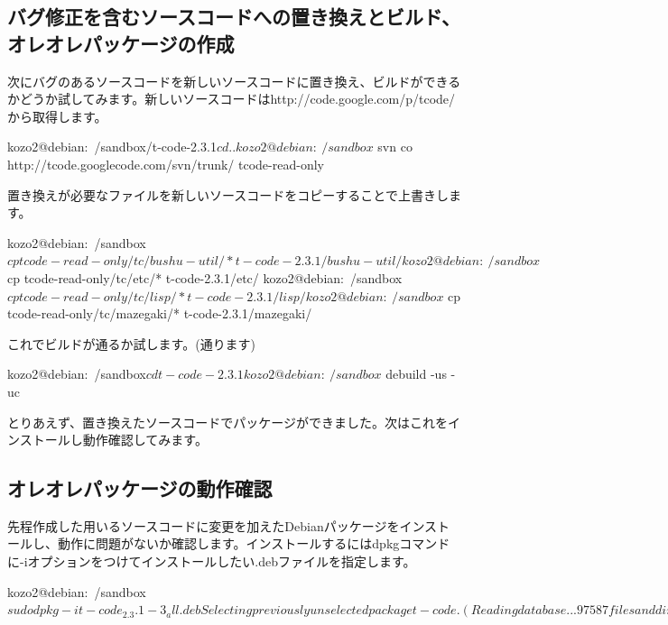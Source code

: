 \documentclass[mingoth,a4paper]{jsarticle}
\begin{document}
\subsection{バグ修正を含むソースコードへの置き換えとビルド、オレオレパッケージの作成}

次にバグのあるソースコードを新しいソースコードに置き換え、ビルドができるかどうか試してみます。新しいソースコードはhttp://code.google.com/p/tcode/から取得します。

\begin{commandline}
kozo2@debian:~/sandbox/t-code-2.3.1$ cd ..
kozo2@debian:~/sandbox$ svn co http://tcode.googlecode.com/svn/trunk/ tcode-read-only
\end{commandline}

置き換えが必要なファイルを新しいソースコードをコピーすることで上書きします。

\begin{commandline}
kozo2@debian:~/sandbox$ cp tcode-read-only/tc/bushu-util/* t-code-2.3.1/bushu-util/
kozo2@debian:~/sandbox$ cp tcode-read-only/tc/etc/* t-code-2.3.1/etc/
kozo2@debian:~/sandbox$ cp tcode-read-only/tc/lisp/* t-code-2.3.1/lisp/
kozo2@debian:~/sandbox$ cp tcode-read-only/tc/mazegaki/* t-code-2.3.1/mazegaki/
\end{commandline}

これでビルドが通るか試します。(通ります)

\begin{commandline}
kozo2@debian:~/sandbox$ cd t-code-2.3.1
kozo2@debian:~/sandbox$ debuild -us -uc
\end{commandline}

とりあえず、置き換えたソースコードでパッケージができました。次はこれをインストールし動作確認してみます。

\subsection{オレオレパッケージの動作確認}
先程作成した用いるソースコードに変更を加えたDebianパッケージをインストールし、動作に問題がないか確認します。インストールするにはdpkgコマンドに-iオプションをつけてインストールしたい.debファイルを指定します。

\begin{commandline}
kozo2@debian:~/sandbox$ sudo dpkg -i t-code_2.3.1-3_all.deb
Selecting previously unselected package t-code.
(Reading database ... 97587 files and directories currently installed.)
Unpacking t-code (from t-code_2.3.1-3_all.deb) ...
Setting up t-code (2:2.3.1-3) ...
install/t-code: Handling install for emacsen flavor emacs23
Processing triggers for install-info ...
kozo2@debian:~/sandbox$
\end{commandline}
\end{document}
